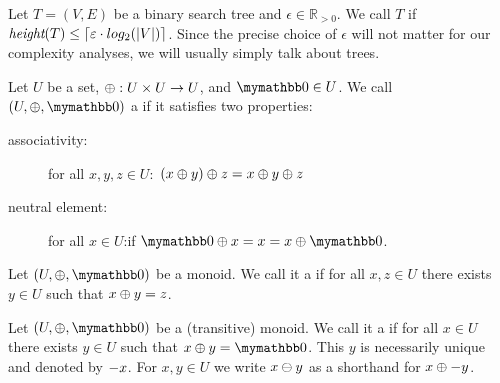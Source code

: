 \begin{definition}
Let $T = (V, E)$ be a binary search tree and $\epsilon \in \mathbb{R}_{> 0}$.
We call $T$  if $\textit{height}(T) \leq \ceil*{\epsilon \cdot log_2(|V|)}$.
Since the precise choice of $\epsilon$ will not matter for our complexity analyses, we will usually simply talk about  trees.
\end{definition}

\begin{definition}
Let $U$ be a set, $\groupaddsym: U \times U \rightarrow U$, and $\neutraladd \in U$.
We call $(U, \groupaddsym, \neutraladd)$ a  if it satisfies two properties:

  \begin{description}
    \item[associativity:] for all $x, y, z \in U:$ $\groupadd{(\groupadd{x}{y})}{z} = \groupadd{x}{\groupadd{y}{z}}$
    \item[neutral element:] for all $x \in U$:if $\groupadd{\neutraladd}{x} = x = \groupadd{x}{\neutraladd}$.
  \end{description}
\end{definition}

\begin{definition}
Let $(U, \groupaddsym, \neutraladd)$ be a monoid.
We call it a  if for all $x, z \in U$ there exists $y \in U$ such that $\groupadd{x}{y} = z$.
\end{definition}

\begin{definition}
Let $(U, \groupaddsym, \neutraladd)$ be a (transitive) monoid.
We call it a  if for all $x \in U$ there exists $y \in U$ such that $\groupadd{x}{y} = \neutraladd$.
This $y$ is necessarily unique and denoted by $\inverseadd{x}$.
For $x, y \in U$ we write $\groupsubtract{x}{y}$ as a shorthand for $\groupadd{x}{\inverseadd{y}}$.
\end{definition}




